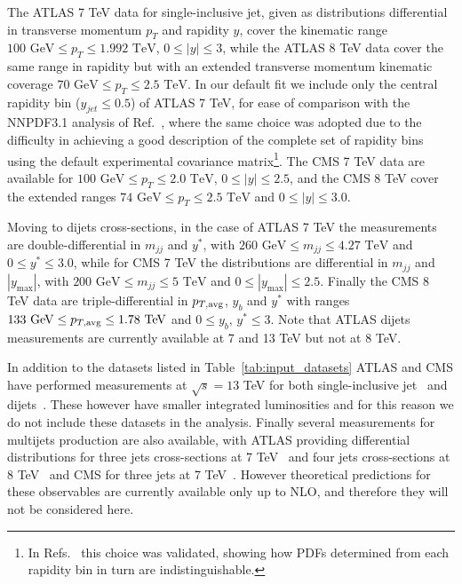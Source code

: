 %
The ATLAS 7 TeV data for single-inclusive jet, given as distributions differential in transverse momentum 
$p_T$ and rapidity $y$, cover the kinematic range $100\,\, \text{GeV} \leq p_T \leq 1.992\,\, \text{TeV}$,
$0 \leq |y| \leq 3$, while the ATLAS 8 TeV data cover the same range in rapidity but with an extended transverse momentum
kinematic coverage $70\,\, \text{GeV} \leq p_T \leq 2.5\,\, \text{TeV}$.
In our default fit we include only the central rapidity bin ($y_{jet} \leq 0.5$) of ATLAS 7 TeV, 
for ease of comparison with the NNPDF3.1 analysis of Ref.~\cite{Ball:2017nwa}, where the same choice was adopted due to
the difficulty in achieving a good description of the complete set of rapidity bins using
the default experimental covariance matrix\footnote{In Refs.~\cite{Ball:2017nwa,Nocera:2017zge} this choice was validated,
showing how PDFs determined from each rapidity bin in turn are indistinguishable.}.
The CMS 7 TeV data are available for $100\,\, \text{GeV} \leq p_T \leq 2.0\,\, \text{TeV}$,
$0 \leq |y| \leq 2.5$, and the CMS 8 TeV cover the extended
ranges $74\,\, \text{GeV} \leq p_T \leq 2.5\,\, \text{TeV}$ and $0 \leq |y| \leq 3.0$.

%
Moving to dijets cross-sections, in the case of ATLAS 7 TeV the measurements are double-differential in
$m_{jj}$ and $y^*$, with
$260\,\,\text{GeV}\leq m_{jj} \leq 4.27\,\,\text{TeV}$ and $0 \leq y^* \leq 3.0$, while for CMS 7 TeV
the distributions are differential in  $m_{jj}$ and $|y_{\text{max}}|$, with
$200\,\,\text{GeV}\leq m_{jj} \leq 5\,\,\text{TeV}$ and $0 \leq |y_{\text{max}}| \leq 2.5$.  
Finally the CMS 8 TeV data are triple-differential in $p_{T,\rm avg}$, $y_b$ and $y^*$ with
ranges $133\,\,\text{GeV} \leq p_{T,\rm avg} \leq 1.78\,\,\text{TeV}$ and $0\leq y_b,\,y^* \leq 3$.
Note that ATLAS dijets measurements are currently available at 7 and 13 TeV but not at 8 TeV.

%
In addition to the datasets listed in Table~\ref{tab:input_datasets} ATLAS and CMS have performed
measurements at $\sqrt{s}=13$ TeV for both single-inclusive jet~\cite{Aaboud:2017wsi,Khachatryan:2016wdh}
and dijets~\cite{Aaboud:2017wsi,Sirunyan:2020uoj}. These however have smaller integrated luminosities and for this reason
we do not include these datasets in the analysis. 
%
Finally several measurements for multijets production are also available, with ATLAS providing differential distributions for
three jets cross-sections at 7 TeV~\cite{Aad:2014rma} and four jets cross-sections at 8 TeV~\cite{Aad:2015nda} 
and CMS for three jets at 7 TeV~\cite{CMS:2014mna}.
However theoretical predictions for these observables are currently available only up to NLO, and therefore they will
not be considered here.

